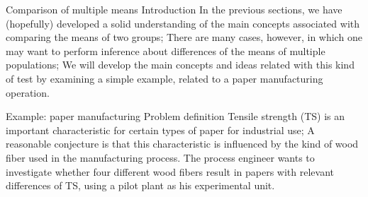 \documentclass[t]{beamer}
\begin{document}
\begin{frame}[b]
\begin{columns}[T]
\end{columns}
\vhalf
{} 
\end{frame}



\begin{ftst}
{Comparison of multiple means}
{Introduction}
In the previous sections, we have (hopefully) developed a solid understanding of the main concepts associated with comparing the means of two groups;
\vone
There are many cases, however, in which one may want to perform inference about differences of the means of multiple populations;
\vone
We will develop the main concepts and ideas related with this kind of test by examining a simple example, related to a paper manufacturing operation.
\end{ftst}


\begin{ftst}
{Example: paper manufacturing}
{Problem definition}
Tensile strength (TS) is an important characteristic for certain types of paper for industrial use;
\vone
A reasonable conjecture is that this characteristic is influenced by the kind of wood fiber used in the manufacturing process.
\vone
The process engineer wants to investigate whether four different wood fibers result in papers with relevant differences of TS, using a pilot plant as his experimental unit.
\end{ftst}
\end{document}
